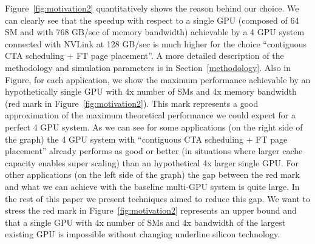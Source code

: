 Figure~\ref{fig:motivation2} quantitatively shows the reason behind our 
choice. We can clearly see that the speedup with respect to a single GPU 
(composed of 64 SM and with 768 GB/sec of memory bandwidth) achievable by a 4 
GPU system connected with NVLink at 128 GB/sec is much higher for the choice 
``contiguous CTA scheduling + FT page placement''. A more detailed 
description of the methodology and simulation parameters is in 
Section~\ref{methodology}. 
Also in Figure, for each application, we show the maximum  performance 
achievable by an hypothetically single GPU with 4x number of SMs and 4x 
memory bandwidth (red mark in Figure~\ref{fig:motivation2}). This mark 
represents a good approximation of the 
maximum theoretical performance we could expect for a perfect 4 GPU system. 
As we can see for some applications (on the right side of the graph) the 4 
GPU system with ``contiguous CTA scheduling + FT page placement'' already 
performs as good or better (in situations where larger cache capacity enables 
super scaling) than an hypothetical 4x larger single GPU. For other 
applications (on the left side of the graph) the gap between the red mark and 
what we can achieve with the baseline multi-GPU system is quite large. In the 
rest of this paper we present techniques aimed to reduce this gap. 
We want to stress the red mark in Figure~\ref{fig:motivation2} represents an 
upper bound and that a single GPU with 4x number of SMs and 4x bandwidth of 
the largest existing GPU is impossible without changing underline silicon 
technology. 










